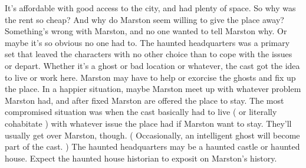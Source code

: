 \documentclass[12pt]{book}
\begin{document}
It's affordable with good access to the city, and had plenty of space. So why was the rent so cheap? And why do Marston seem willing to give the place away? Something's wrong with Marston, and no one wanted to tell Marston why. Or maybe it's so obvious no one had to. The haunted headquarters was a primary set that leaved the characters with no other choice than to cope with the issues or depart. Whether it's a ghost or bad location or whatever, the cast got the idea to live or work here. Marston may have to help or exorcise the ghosts and fix up the place. In a happier situation, maybe Marston meet up with whatever problem Marston had, and after fixed Marston are offered the place to stay. The most compromised situation was when the cast basically had to live ( or literally cohabitate ) with whatever issue the place had if Marston want to stay. They'll usually get over Marston, though. ( Occasionally, an intelligent ghost will become part of the cast. ) The haunted headquarters may be a haunted castle or haunted house. Expect the haunted house historian to exposit on Marston's history.
\end{document}
